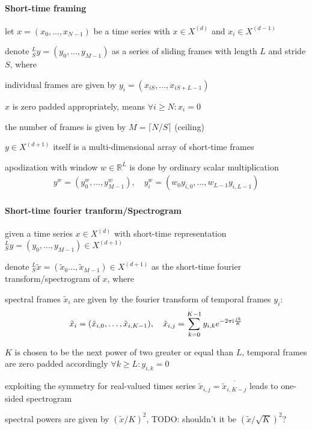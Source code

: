 \paragraph{Short-time framing}
\begin{itemize*}
	\item let $x=(x_0,\ldots,x_{N-1})$ be a time series with $x\in X^{(d)}$ and $x_i\in X^{(d-1)}$
	\item denote $^L_Sy=(y_0,\ldots,y_{M-1})$ as a series of sliding frames with length $L$ and stride $S$, where
		\begin{itemize*}
			\item individual frames are given by $y_i=(x_{iS},\ldots,x_{iS+L-1})$
			\item $x$ is zero padded appropriately, means $\forall i\ge N:x_i=0$
			\item the number of frames is given by $M=\lceil N/S\rceil$ (ceiling)
		\end{itemize*}
	\item $y\in X^{(d+1)}$ itself is a multi-dimensional array of short-time frames
	\item apodization with window $w\in\mathbb R^L$ is done by ordinary scalar multiplication
		\begin{eqnarray*}
			y^w=(y_0^w,\ldots,y_{M-1}^w),\quad y_i^w=(w_0y_{i,0},\ldots,w_{L-1}y_{i,L-1})
		\end{eqnarray*}
\end{itemize*}

\paragraph{Short-time fourier tranform/Spectrogram}
\begin{itemize*}
	\item given a time series $x\in X^{(d)}$ with short-time representation $^L_Sy=(y_0,\ldots,y_{M-1})\in X^{(d+1)}$
	\item denote $^L_S\tilde x=(\tilde x_0\ldots,\tilde x_{M-1})\in X^{(d+1)}$ as the short-time fourier transform/spectrogram of $x$, where
		\begin{itemize*}
			\item spectral frames $\tilde x_i$ are given by the fourier transform of temporal frames $y_i$:
				\begin{eqnarray*}
					\tilde x_i=(\tilde x_{i,0},\ldots,\tilde x_{i,K-1}),\quad \tilde x_{i,j}=\sum_{k=0}^{K-1}y_{i,k}e^{-2\pi\textnormal{i}\frac{jk}K}
				\end{eqnarray*}
			\item $K$ is chosen to be the next power of two greater or equal than $L$, temporal frames are zero padded accordingly $\forall k\ge L:y_{i,k}=0$
		\end{itemize*}
	\item exploiting the symmetry for real-valued times series $\tilde x_{i,j}=\overline{\tilde x_{i,K-j}}$ leads to one-sided spectrogram
	\item spectral powers are given by $(\tilde x/K)^2$, TODO: shouldn't it be $(\tilde x/\sqrt{K})^2$?
\end{itemize*}

